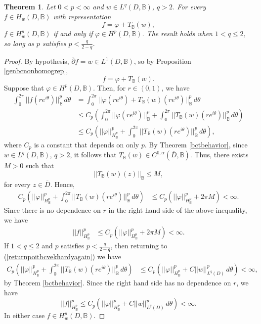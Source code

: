 \documentclass[suppldata]{interact}
\theoremstyle{plain}%
\newtheorem{theorem}{Theorem}[section]
\theoremstyle{definition}
\theoremstyle{remark}
\newcommand{\dbar}{\bar\partial}
\newcommand{\bc}{\mathbb{B}}
\newcommand{\hpb}{H^p(D,\bc)}
\newcommand{\hw}{H_w(D, \bc)}
\newcommand{\hwp}{H^p_{w}(D,\bc)}
\begin{document}
\begin{theorem}\label{generalbchardyrep}
    Let $0 < p < \infty$ and $w \in L^q(D,\bc)$, $q>2$. For every $f \in \hw$ with representation 
    \[
        f = \varphi + T_\bc(w),
    \]
    $ f \in \hwp$ if and only if $\varphi \in \hpb$. The result holds when $1 < q \leq 2$, so long as $p$ satisfies $p < \frac{q}{2-q}$. 
\end{theorem}

\begin{proof}
By hypothesis, $\dbar f= w \in L^1(D, \bc)$, so by Proposition \ref{genbcnonhomogrep}, 
\[
        f = \varphi + T_\bc(w).
\]
Suppose that $\varphi \in H^p(D,\bc)$. Then, for $r \in (0,1)$, we have
\begin{align}
 \int_0^{2\pi} ||f(re^{i\theta})||_{\bc}^p \,d\theta 
 &= \int_0^{2\pi} ||\varphi(re^{i\theta}) + T_\bc(w)(re^{i\theta})||_{\bc}^p \,d\theta \nonumber \\ 
 &\leq C_p\left( \int_0^{2\pi} ||\varphi(re^{i\theta})||_{\bc}^p + \int_0^{2\pi} ||T_\bc(w)(re^{i\theta})||_{\bc}^p \,d\theta \right) \nonumber\\
  &\leq C_p\left( ||\varphi||_{H^p_\bc}^p + \int_0^{2\pi} ||T_\bc(w)(re^{i\theta})||_{\bc}^p \,d\theta \right), \label{returnpoitbcvekhardyagain}
\end{align}
where $C_p$ is a constant that depends on only $p$. By Theorem \ref{bctbehavior}, since $ w\in L^q(D,\bc)$, $q>2$, it follows that $T_\bc(w) \in C^{0,\alpha}(\overline{D},\bc)$. Thus, there exists $M>0$ such that 
\[
        ||T_\bc(w)(z)||_{\bc} \leq M,
\]
for every $z \in \overline{D}$. Hence, 
\begin{align*}
C_p\left( ||\varphi||_{H^p_\bc}^p + \int_0^{2\pi} ||T_\bc(w)(re^{i\theta})||_{\bc}^p \,d\theta \right)
&\leq C_p\left( ||\varphi||_{H^p_\bc}^p + 2\pi M \right)< \infty.
\end{align*}
Since there is no dependence on $r$ in the right hand side of the above inequality, we have 
\begin{align*}
||f||_{H^p_\bc}^p &\leq C_p\left( ||\varphi||_{H^p_\bc}^p + 2\pi M \right)< \infty.
\end{align*}
If $1 < q \leq 2$ and $p$ satisfies $p < \frac{q}{2-q}$, then returning to (\ref{returnpoitbcvekhardyagain}) we have
\begin{align*}
C_p\left( ||\varphi||_{H^p_\bc}^p + \int_0^{2\pi} ||T_\bc(w)(re^{i\theta})||_{\bc}^p \,d\theta \right)
&\leq C_p\left( ||\varphi||_{H^p_\bc}^p + C||w||^p_{L^q(D)} \,d\theta \right) < \infty,
\end{align*}
by Theorem \ref{bctbehavior}. Since the right hand side has no dependence on $r$, we have
\[
||f||_{H^p_\bc}^p \leq C_p\left( ||\varphi||_{H^p_\bc}^p + C||w||^p_{L^q(D)} \,d\theta \right) < \infty.
\]
In either case $f \in H^p_{w}(D,\bc)$. 


\end{proof}
\end{document}
